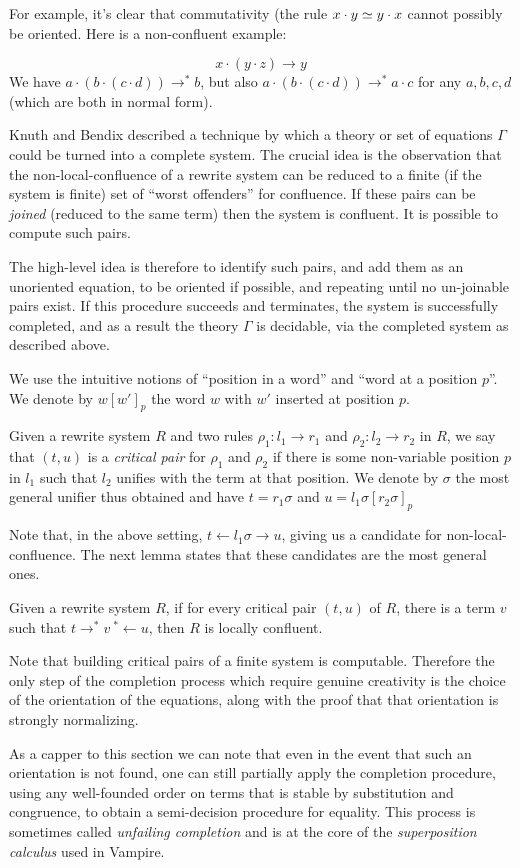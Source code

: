 For example, it's clear that commutativity (the rule $x\cdot y\simeq y\cdot x$ cannot possibly be oriented. Here is a non-confluent example:

\[ x \cdot (y \cdot z) \rightarrow y \]
We have $a\cdot (b \cdot (c \cdot d)) \rightarrow^* b$, but also $a\cdot (b\cdot (c\cdot d))\rightarrow^* a\cdot c$ for any $a, b, c, d$ (which are both in normal form).

Knuth and Bendix \cite{knuth-bendix} described a technique by which a theory or set of equations $\Gamma$ could be turned into a complete system. The crucial idea is the observation that the non-local-confluence of a rewrite system can be reduced to a finite (if the system is finite) set of ``worst offenders'' for confluence. If these pairs can be \emph{joined} (reduced to the same term) then the system is confluent. It is possible to compute such pairs.

The high-level idea is therefore to identify such pairs, and add them as an unoriented equation, to be oriented if possible, and repeating until no un-joinable pairs exist. If this procedure succeeds and terminates, the system is successfully completed, and as a result the theory $\Gamma$ is decidable, via the completed system as described above.

We use the intuitive notions of ``position in a word'' and ``word at a position $p$''. We denote by $w[w']_p$ the word $w$ with $w'$ inserted at position $p$.

\begin{definition}
  Given a rewrite system $R$ and two rules $\rho_1: l_1\rightarrow r_1$ and $\rho_2: l_2\rightarrow r_2$ in $R$, we say that $(t, u)$ is a \emph{critical pair} for $\rho_1$ and $\rho_2$ if there is some non-variable position $p$ in $l_1$ such that $l_2$ unifies with the term at that position. We denote by $\sigma$ the most general unifier thus obtained and have $t = r_1\sigma$ and $u = l_1\sigma[r_2\sigma]_p$
\end{definition}

Note that, in the above setting, $t\leftarrow l_1\sigma\rightarrow u$, giving us a candidate for non-local-confluence. The next lemma states that these candidates are the most general ones.

\begin{theorem}
  Given a rewrite system $R$, if for every critical pair $(t, u)$ of $R$, there is a term $v$ such that $t\rightarrow^* v\ {}^*\leftarrow u$, then $R$ is locally confluent.
\end{theorem}

Note that building critical pairs of a finite system is computable. Therefore the only step of the completion process which require genuine creativity is the choice of the orientation of the equations, along with the proof that that orientation is strongly normalizing.

As a capper to this section we can note that even in the event that such an orientation is not found, one can still partially apply the completion procedure, using any well-founded order on terms that is stable by substitution and congruence, to obtain a semi-decision procedure for equality. This process is sometimes called \emph{unfailing completion} and is at the core of the \emph{superposition calculus} used in Vampire.
